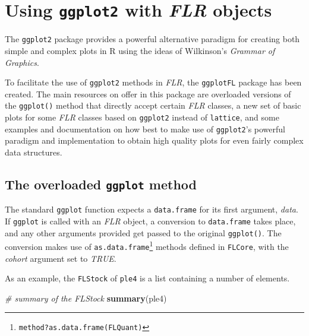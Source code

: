 \documentclass[]{article}
\newenvironment{Shaded}{\begin{snugshade}}{\end{snugshade}}
\newcommand{\KeywordTok}[1]{\textcolor[rgb]{0.13,0.29,0.53}{\textbf{{#1}}}}
\newcommand{\CommentTok}[1]{\textcolor[rgb]{0.56,0.35,0.01}{\textit{{#1}}}}
\newcommand{\NormalTok}[1]{{#1}}
\let\rmarkdownfootnote\footnote%
\def\footnote{\protect\rmarkdownfootnote}
\begin{document}
\section{\texorpdfstring{Using \texttt{ggplot2} with \emph{FLR}
objects}{Using ggplot2 with FLR objects}}\label{using-ggplot2-with-flr-objects}

The \texttt{ggplot2} package provides a powerful alternative paradigm
for creating both simple and complex plots in R using the ideas of
Wilkinson's \emph{Grammar of Graphics}.

To facilitate the use of \texttt{ggplot2} methods in \emph{FLR}, the
\texttt{ggplotFL} package has been created. The main resources on offer
in this package are overloaded versions of the \texttt{ggplot()} method
that directly accept certain \emph{FLR} classes, a new set of basic
plots for some \emph{FLR} classes based on \texttt{ggplot2} instead of
\texttt{lattice}, and some examples and documentation on how best to
make use of \texttt{ggplot2}'s powerful paradigm and implementation to
obtain high quality plots for even fairly complex data structures.

\subsection{\texorpdfstring{The overloaded \texttt{ggplot}
method}{The overloaded ggplot method}}\label{the-overloaded-ggplot-method}

The standard \texttt{ggplot} function expects a \texttt{data.frame} for
its first argument, \emph{data}. If \texttt{ggplot} is called with an
\emph{FLR} object, a conversion to \texttt{data.frame} takes place, and
any other arguments provided get passed to the original
\texttt{ggplot()}. The conversion makes use of
\texttt{as.data.frame}\footnote{\texttt{method?as.data.frame(\textquotesingle{}FLQuant\textquotesingle{})}}
methods defined in \texttt{FLCore}, with the \emph{cohort} argument set
to \emph{TRUE}.

As an example, the \texttt{FLStock} of \texttt{ple4} is a list
containing a number of elements.

\begin{Shaded}
\begin{Highlighting}[]
\CommentTok{# summary of the FLStock}
\KeywordTok{summary}\NormalTok{(ple4)}
\end{Highlighting}
\end{Shaded}
\end{document}
